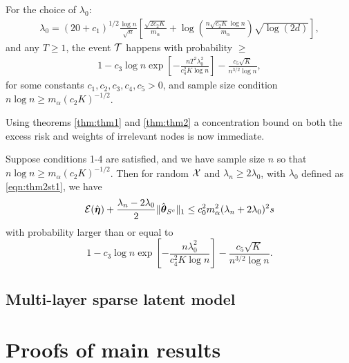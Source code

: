 \documentclass[11pt,letterpaper]{article}
\numberwithin{equation}{section}
\begin{document}
\begin{Theorem}\label{thm:thm2}
For the choice of $\lambda_0$:
%
\begin{align}\label{eqn:thm2st1}
\lambda_0 = (20 + c_1 )^{1/2} \frac{\log n}{\sqrt n} \left[ \frac{ \sqrt{2 c_2 K}}{m_\alpha} + 
\log \left( \frac{n \sqrt{c_2 K} \log n}{m_\alpha} \right) \sqrt{ \log (2d)} \right],
\end{align}
%
and any $T \geq 1$, the event ${\cal{T}}$ happens with probability $\geq$
%
\begin{align}\label{eqn:thm2st2}
1 - c_3 \log n \exp \left[ - \frac{n T^2 \lambda_0^2 }{ c_4^2 K \log n} \right] - \frac{c_5 \sqrt K}{n^{3/2} \log n},
\end{align}
%
for some constants $c_1, c_2, c_3, c_4, c_5 > 0$, and sample size condition $n \log n \geq m_\alpha (c_2 K)^{-1/2}$.
\end{Theorem}

Using theorems \ref{thm:thm1} and \ref{thm:thm2} a concentration bound on both the excess risk and weights of irrelevant nodes is now immediate.

\begin{Corollary}\label{corollary:cor1}
Suppose conditions 1-4 are satisfied, and we have sample size $n$ so that $n \log n \geq m_\alpha (c_2 K)^{-1/2}$. Then for random ${\cal{X}}$ and $\lambda_n \geq 2 \lambda_0$, with $\lambda_0$ defined as \eqref{eqn:thm2st1}, we have
$$
{\cal{E}}(\hat {{\boldsymbol{\eta}}} ) + \frac{\lambda_n - 2\lambda_0}{2} \| \hat {{\boldsymbol{\theta}}}_{S^c} \|_1 \leq
c_0^2 m_\alpha^2 (\lambda_n + 2\lambda_0)^2 s
$$
%
with probability larger than or equal to
%
$$
1 - c_3 \log n \exp \left[ - \frac{n \lambda_0^2 }{ c_4^2 K \log n} \right] - \frac{c_5 \sqrt K}{n^{3/2} \log n}.
$$
%
\end{Corollary}

\subsection{Multi-layer sparse latent model}


\section{Proofs of main results}
\end{document}
